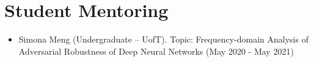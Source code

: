 \section*{Student Mentoring}
\vspace{\postsubhead}
\begin{adjustwidth}{\indentleft}{\indentright}
  \begin{itemize}
    
    \item Simona Meng (Undergraduate – UofT). Topic: Frequency-domain Analysis of Adversarial Robustness of Deep Neural Networks (May 2020 - May 2021) 
    
  \end{itemize}
\end{adjustwidth}
